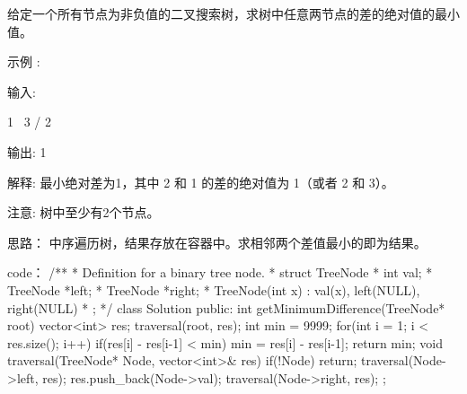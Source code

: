 给定一个所有节点为非负值的二叉搜索树，求树中任意两节点的差的绝对值的最小值。

示例 :

输入:

   1
    \
     3
    /
   2

输出:
1

解释:
最小绝对差为1，其中 2 和 1 的差的绝对值为 1（或者 2 和 3）。

注意: 树中至少有2个节点。
























思路：
中序遍历树，结果存放在容器中。求相邻两个差值最小的即为结果。





















code：
/**
 * Definition for a binary tree node.
 * struct TreeNode {
 *     int val;
 *     TreeNode *left;
 *     TreeNode *right;
 *     TreeNode(int x) : val(x), left(NULL), right(NULL) {}
 * };
 */
class Solution {
public:
    int getMinimumDifference(TreeNode* root) {
        vector<int> res;
        traversal(root, res);
        int min = 9999;
        for(int i = 1; i < res.size(); i++)
        {
            if(res[i] - res[i-1] < min)
                min = res[i] - res[i-1];
        }
        return min;
    }
    void traversal(TreeNode* Node, vector<int>& res)
    {
        if(!Node) return;
        traversal(Node->left, res);
        res.push_back(Node->val);
        traversal(Node->right, res);
    }
};